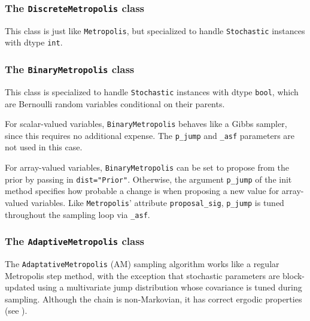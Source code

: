 \subsubsection{The \texttt{DiscreteMetropolis} class}
This class is just like \texttt{Metropolis}, but specialized to handle \texttt{Stochastic} instances with dtype \texttt{int}.

\subsubsection{The \texttt{BinaryMetropolis} class} 
This class is specialized to handle \texttt{Stochastic} instances with dtype \texttt{bool}, which are Bernoulli random variables conditional on their parents. 

For scalar-valued variables, \texttt{BinaryMetropolis} behaves like a Gibbs sampler, since this requires no additional expense. The \texttt{p_jump} and \texttt{_asf} parameters are not used in this case.

For array-valued variables, \texttt{BinaryMetropolis} can be set to propose from the prior by passing in \texttt{dist="Prior"}. Otherwise, the argument \texttt{p_jump} of the init method specifies how probable a change is when proposing a new value for array-valued variables. Like \texttt{Metropolis}' attribute \texttt{proposal_sig}, \texttt{p_jump} is tuned throughout the sampling loop via \texttt{_asf}.

\subsubsection{The \texttt{AdaptiveMetropolis} class} 
The \texttt{AdaptativeMetropolis} (AM) sampling algorithm works like a regular Metropolis step method, with the exception that stochastic parameters are block-updated using a multivariate jump distribution whose covariance is tuned during sampling. Although the chain is non-Markovian, it has correct ergodic properties (see \cite{Haario:2001lr}).

